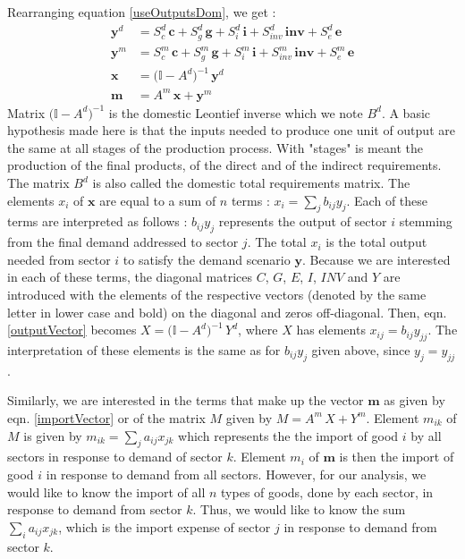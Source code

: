 \documentclass[12pt,english]{article}
\begin{document}
Rearranging equation \ref{useOutputsDom}, we get :
\begin{align}
\boldsymbol{y}^d &= S^d_{c} \, \boldsymbol{c} + S^d_{g} \, \boldsymbol{g} + S^d_{i} \, \boldsymbol{i} + S^d_{inv} \, \boldsymbol{inv} + S^d_{e} \, \boldsymbol{e} \nonumber \\
\boldsymbol{y}^m &= S^m_{c} \, \boldsymbol{c} + S^m_{g} \, \boldsymbol{g} + S^m_{i} \, \boldsymbol{i} + S^m_{inv} \, \boldsymbol{inv} + S^m_{e} \, \boldsymbol{e} \nonumber  \\
\boldsymbol{x} &= \big(\mathbb{I} - A^d \big)^{-1} \, \boldsymbol{y}^d \label{outputVector} \\
\boldsymbol{m} &= A^m \, \boldsymbol{x} + \boldsymbol{y}^m \label{importVector} 
\end{align}
Matrix $\big(\mathbb{I} - A^d \big)^{-1}$ is the domestic Leontief inverse which we note $B^d$. A basic hypothesis made here is that the inputs needed to produce one unit of output are the same at all stages of the production process. With "stages" is meant the production of the final products, of the direct and of the indirect requirements. The matrix $B^d$ is also called the domestic total requirements matrix.
The elements $x_i$ of $\boldsymbol{x}$ are equal to a sum of $n$ terms : $x_i = \sum_j b_{ij}y_j$. Each of these terms are interpreted as follows : $b_{ij}y_j$ represents the output of sector $i$ stemming from the final demand addressed to sector $j$. The total $x_i$ is the total output needed from sector $i$ to satisfy the demand scenario $\boldsymbol{y}$. Because we are interested in each of these terms, the diagonal matrices $C$, $G$, $E$, $I$, $INV$ and $Y$ are introduced with the elements of the respective vectors (denoted by the same letter in lower case and bold) on the diagonal and zeros off-diagonal. Then, eqn. \ref{outputVector} becomes $X = \big(\mathbb{I} - A^d \big)^{-1} \, Y^d$, where $X$ has elements $x_{ij} = b_{ij}y_{jj}$. The interpretation of these elements is the same as for $b_{ij}y_j$ given above, since $y_j = y_{jj}$.

Similarly, we are interested in the terms that make up the vector $\boldsymbol{m}$ as given by eqn. \ref{importVector} or of the matrix $M$ given by $M = A^m \, X + Y^m$. Element $m_{ik}$ of $M$ is given by $m_{ik} = \sum_j a_{ij}x_{jk}$ which represents the the import of good $i$ by all sectors in response to demand of sector $k$. Element $m_i$ of $\boldsymbol{m}$ is then the import of good $i$ in response to demand from all sectors. However, for our analysis, we would like to know the import of all $n$ types of goods, done by each sector, in response to demand from sector $k$. Thus, we would like to know the sum $\sum_i a_{ij}x_{jk}$, which is the import expense of sector $j$ in response to demand from sector $k$. 
\end{document}
